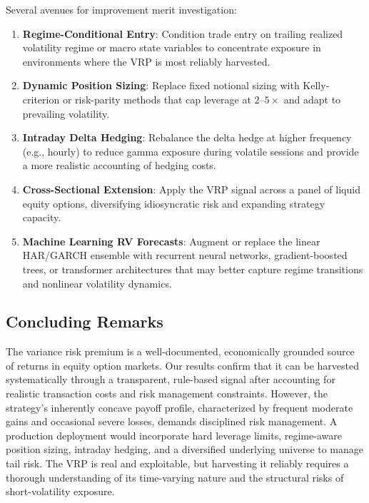 \documentclass[11pt,a4paper]{article}
\begin{document}
Several avenues for improvement merit investigation:
\begin{enumerate}[nosep]
    \item \textbf{Regime-Conditional Entry}: Condition trade entry on trailing realized volatility regime or macro state variables to concentrate exposure in environments where the VRP is most reliably harvested.
    \item \textbf{Dynamic Position Sizing}: Replace fixed notional sizing with Kelly-criterion or risk-parity methods that cap leverage at $2$--$5\times$ and adapt to prevailing volatility.
    \item \textbf{Intraday Delta Hedging}: Rebalance the delta hedge at higher frequency (e.g., hourly) to reduce gamma exposure during volatile sessions and provide a more realistic accounting of hedging costs.
    \item \textbf{Cross-Sectional Extension}: Apply the VRP signal across a panel of liquid equity options, diversifying idiosyncratic risk and expanding strategy capacity.
    \item \textbf{Machine Learning RV Forecasts}: Augment or replace the linear HAR/GARCH ensemble with recurrent neural networks, gradient-boosted trees, or transformer architectures that may better capture regime transitions and nonlinear volatility dynamics.
\end{enumerate}

\subsection{Concluding Remarks}

The variance risk premium is a well-documented, economically grounded source of returns in equity option markets.
Our results confirm that it can be harvested systematically through a transparent, rule-based signal after accounting for realistic transaction costs and risk management constraints.
However, the strategy's inherently concave payoff profile, characterized by frequent moderate gains and occasional severe losses, demands disciplined risk management.
A production deployment would incorporate hard leverage limits, regime-aware position sizing, intraday hedging, and a diversified underlying universe to manage tail risk.
The VRP is real and exploitable, but harvesting it reliably requires a thorough understanding of its time-varying nature and the structural risks of short-volatility exposure.


\newpage

\end{document}

